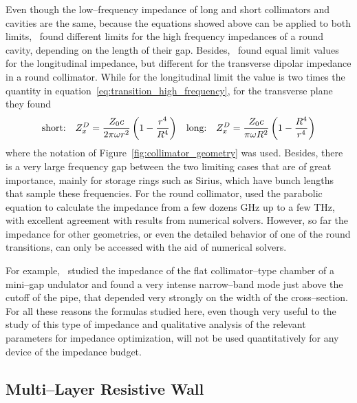     Even though the low--frequency impedance of long and short collimators and cavities are the same, because the equations showed above can be applied to both limits,~ found different limits for the high frequency impedances of a round cavity, depending on the length of their gap. Besides,~ found equal limit values for the longitudinal impedance, but different for the transverse dipolar impedance in a round collimator. While for the longitudinal limit the value is two times the quantity in equation~\eqref{eq:transition_high_frequency}, for the transverse plane they found
    \begin{align}
        \text{short:}\quad Z_x^D = \frac{Z_0c}{2\pi\omega r^2}\left(1-\frac{r^4}{R^4}\right) &&
        \text{long:}\quad Z_x^D = \frac{Z_0c}{\pi\omega R^2}\left(1-\frac{R^4}{r^4}\right)
    \end{align}
    where the notation of Figure~\ref{fig:collimator_geometry} was used. Besides, there is a very large frequency gap between the two limiting cases that are of great importance, mainly for storage rings such as Sirius, which have bunch lengths that sample these frequencies. For the round collimator,  used the parabolic equation to calculate the impedance from a few dozens \si{\giga\hertz} up to a few \si{\tera\hertz}, with excellent agreement with results from numerical solvers. However, so far the impedance for other geometries, or even the detailed behavior of one of the round transitions, can only be accessed with the aid of numerical solvers.

    For example,~ studied the impedance of the flat collimator--type chamber of a mini--gap undulator and found a very intense narrow--band mode just above the cutoff of the pipe, that depended very strongly on the width of the cross--section. For all these reasons the formulas studied here, even though very useful to the study of this type of impedance and qualitative analysis of the relevant parameters for impedance optimization, will not be used quantitatively for any device of the impedance budget.

\subsection{Multi--Layer Resistive Wall}

